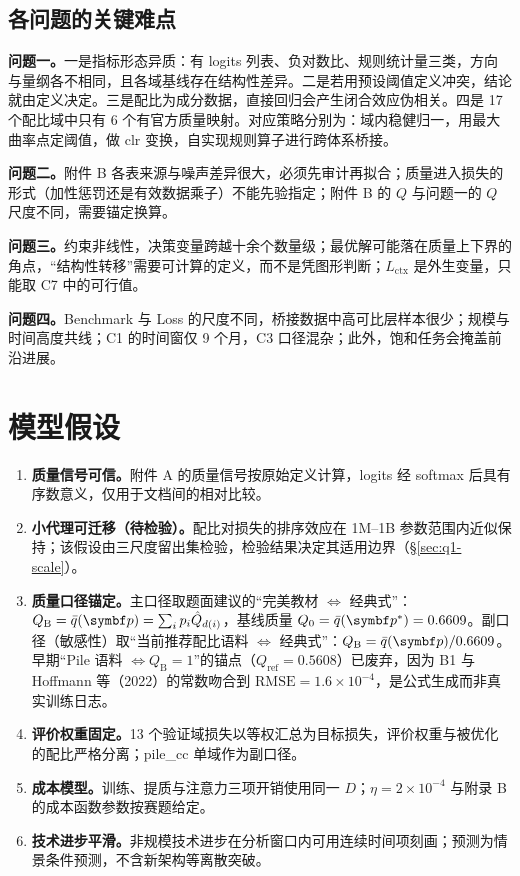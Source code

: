 \subsection{各问题的关键难点}

\textbf{问题一。}一是指标形态异质：有 logits 列表、负对数比、规则统计量三类，方向与量纲各不相同，且各域基线存在结构性差异。二是若用预设阈值定义冲突，结论就由定义决定。三是配比为成分数据，直接回归会产生闭合效应伪相关。四是 17 个配比域中只有 6 个有官方质量映射。对应策略分别为：域内稳健归一，用最大曲率点定阈值，做 clr 变换，自实现规则算子进行跨体系桥接。

\textbf{问题二。}附件 B 各表来源与噪声差异很大，必须先审计再拟合；质量进入损失的形式（加性惩罚还是有效数据乘子）不能先验指定；附件 B 的 $Q$ 与问题一的 $Q$ 尺度不同，需要锚定换算。

\textbf{问题三。}约束非线性，决策变量跨越十余个数量级；最优解可能落在质量上下界的角点，“结构性转移”需要可计算的定义，而不是凭图形判断；$L_{\mathrm{ctx}}$ 是外生变量，只能取 C7 中的可行值。

\textbf{问题四。}Benchmark 与 Loss 的尺度不同，桥接数据中高可比层样本很少；规模与时间高度共线；C1 的时间窗仅 9 个月，C3 口径混杂；此外，饱和任务会掩盖前沿进展。

\section{模型假设}

\begin{enumerate}[label=\arabic*.,leftmargin=2em]
\item \textbf{质量信号可信。}附件 A 的质量信号按原始定义计算，logits 经 softmax 后具有序数意义，仅用于文档间的相对比较。
\item \textbf{小代理可迁移（待检验）。}配比对损失的排序效应在 1M–1B 参数范围内近似保持；该假设由三尺度留出集检验，检验结果决定其适用边界（\S\ref{sec:q1-scale}）。
\item \textbf{质量口径锚定。}主口径取题面建议的“完美教材 $\Leftrightarrow$ 经典式”：$Q_{\mathrm B}=\bar q(\bp)=\sum_i p_i\hat Q_{d(i)}$，基线质量 $Q_0=\bar q(\bp^*)=0.6609$。副口径（敏感性）取“当前推荐配比语料 $\Leftrightarrow$ 经典式”：$Q_{\mathrm B}=\bar q(\bp)/0.6609$。早期“Pile 语料 $\Leftrightarrow Q_{\mathrm B}=1$”的锚点（$Q_{\mathrm{ref}}=0.5608$）已废弃，因为 B1 与 Hoffmann 等（2022）的常数吻合到 $\mathrm{RMSE}=1.6\times10^{-4}$，是公式生成而非真实训练日志。
\item \textbf{评价权重固定。}13 个验证域损失以等权汇总为目标损失，评价权重与被优化的配比严格分离；pile\_cc 单域作为副口径。
\item \textbf{成本模型。}训练、提质与注意力三项开销使用同一 $D$；$\eta=2\times10^{-4}$ 与附录 B 的成本函数参数按赛题给定。
\item \textbf{技术进步平滑。}非规模技术进步在分析窗口内可用连续时间项刻画；预测为情景条件预测，不含新架构等离散突破。
\end{enumerate}

